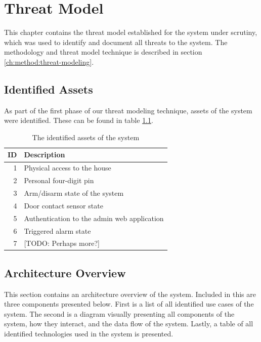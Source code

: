 \chapter{Threat Model} \label{ch:threat-model}
This chapter contains the threat model established for the system under scrutiny, which was used to identify and document all threats to the system. The methodology and threat model technique is described in section \ref{ch:method:threat-modeling}.

\section{Identified Assets}
As part of the first phase of our threat modeling technique, assets of the system were identified. These can be found in table \ref{tb:assets}.
\begin{table}[!ht]
    \centering
    \begin{tabularx}{\textwidth}{r X}
        \hline
        \textbf{ID} & \textbf{Description}
        \\ \hline
        1  & Physical access to the house
        \\
        2  & Personal four-digit pin
        \\
        3  & Arm/disarm state of the system
        \\
        4  & Door contact sensor state
        \\
        5  & Authentication to the admin web application
        \\
        6  & Triggered alarm state
        \\
        7  & [TODO: Perhaps more?]
        \\ \hline
    \end{tabularx}
    \caption{The identified assets of the system}
    \label{tb:assets}
\end{table}

\section{Architecture Overview}
This section contains an architecture overview of the system. Included in this are three components presented below. First is a list of all identified use cases of the system. The second is a diagram visually presenting all components of the system, how they interact, and the data flow of the system. Lastly, a table of all identified technologies used in the system is presented.

